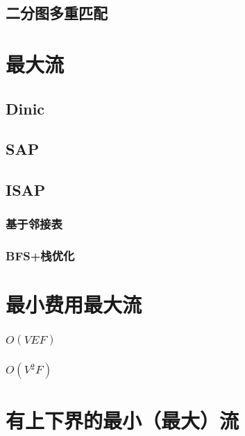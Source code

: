 \subsection{二分图多重匹配}



\section{最大流}
\subsection{Dinic}


\subsection{SAP}


\subsection{ISAP}
\subsubsection{基于邻接表}

\subsubsection{BFS+栈优化}


\section{最小费用最大流}
\subsubsection{$O(VEF)$}

\subsubsection{$O(V^2F)$}


\section{有上下界的最小（最大）流}


\endinput %

